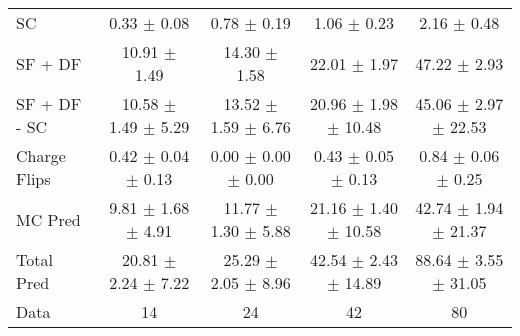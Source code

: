 \begin{tabular}{l|cccc}
                                 SC &  0.33 $\pm$  0.08 &  0.78 $\pm$  0.19 &  1.06 $\pm$  0.23 &  2.16 $\pm$  0.48 \\
                            SF + DF & 10.91 $\pm$  1.49 & 14.30 $\pm$  1.58 & 22.01 $\pm$  1.97 & 47.22 $\pm$  2.93 \\
\hline
                       SF + DF - SC & 10.58 $\pm$  1.49 $\pm$  5.29 & 13.52 $\pm$  1.59 $\pm$  6.76 & 20.96 $\pm$  1.98 $\pm$ 10.48 & 45.06 $\pm$  2.97 $\pm$ 22.53 \\
\hline\hline
                       Charge Flips &  0.42 $\pm$  0.04 $\pm$  0.13 &  0.00 $\pm$  0.00 $\pm$  0.00 &  0.43 $\pm$  0.05 $\pm$  0.13 &  0.84 $\pm$  0.06 $\pm$  0.25 \\
\hline
                            MC Pred &  9.81 $\pm$  1.68 $\pm$  4.91 & 11.77 $\pm$  1.30 $\pm$  5.88 & 21.16 $\pm$  1.40 $\pm$ 10.58 & 42.74 $\pm$  1.94 $\pm$ 21.37 \\
\hline
                         Total Pred & 20.81 $\pm$  2.24 $\pm$  7.22 & 25.29 $\pm$  2.05 $\pm$  8.96 & 42.54 $\pm$  2.43 $\pm$ 14.89 & 88.64 $\pm$  3.55 $\pm$ 31.05 \\
\hline\hline
                               Data &    14 &    24 &    42 &    80 \\
\hline\hline
\end{tabular}

